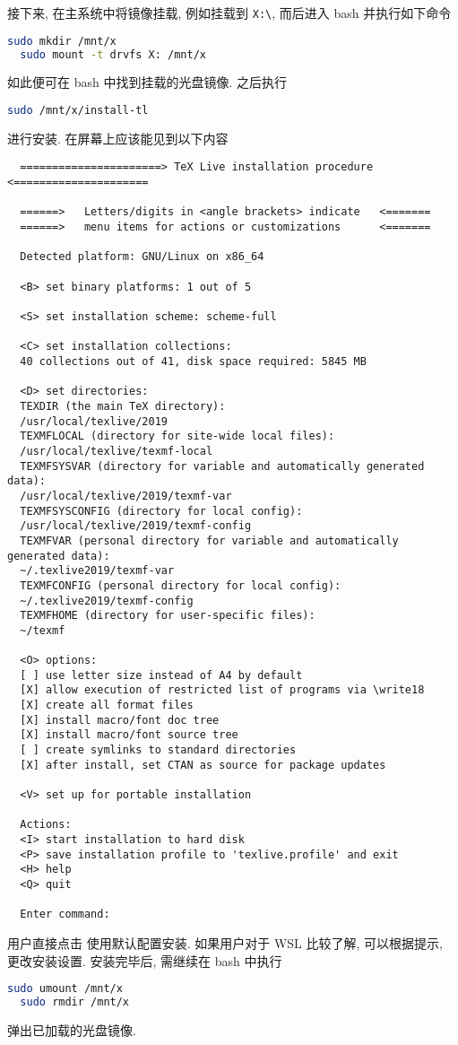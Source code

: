 接下来, 在主系统中将镜像挂载,
例如挂载到 \texttt{X:\textbackslash},
而后进入 \textsf{bash} 并执行如下命令
\begin{lstlisting}[language = bash]
  sudo mkdir /mnt/x
  sudo mount -t drvfs X: /mnt/x
\end{lstlisting}
如此便可在 \textsf{bash} 中找到挂载的光盘镜像.
之后执行
\begin{lstlisting}[language = bash]
  sudo /mnt/x/install-tl
\end{lstlisting}
进行安装.
在屏幕上应该能见到以下内容
\begin{lstlisting}
  ======================> TeX Live installation procedure <=====================

  ======>   Letters/digits in <angle brackets> indicate   <=======
  ======>   menu items for actions or customizations      <=======
  
  Detected platform: GNU/Linux on x86_64
  
  <B> set binary platforms: 1 out of 5
  
  <S> set installation scheme: scheme-full
  
  <C> set installation collections:
  40 collections out of 41, disk space required: 5845 MB
  
  <D> set directories:
  TEXDIR (the main TeX directory):
  /usr/local/texlive/2019
  TEXMFLOCAL (directory for site-wide local files):
  /usr/local/texlive/texmf-local
  TEXMFSYSVAR (directory for variable and automatically generated data):
  /usr/local/texlive/2019/texmf-var
  TEXMFSYSCONFIG (directory for local config):
  /usr/local/texlive/2019/texmf-config
  TEXMFVAR (personal directory for variable and automatically generated data):
  ~/.texlive2019/texmf-var
  TEXMFCONFIG (personal directory for local config):
  ~/.texlive2019/texmf-config
  TEXMFHOME (directory for user-specific files):
  ~/texmf

  <O> options:
  [ ] use letter size instead of A4 by default
  [X] allow execution of restricted list of programs via \write18
  [X] create all format files
  [X] install macro/font doc tree
  [X] install macro/font source tree
  [ ] create symlinks to standard directories
  [X] after install, set CTAN as source for package updates
  
  <V> set up for portable installation
  
  Actions:
  <I> start installation to hard disk
  <P> save installation profile to 'texlive.profile' and exit
  <H> help
  <Q> quit
  
  Enter command: 
\end{lstlisting}
用户直接点击  使用默认配置安装.
如果用户对于 WSL 比较了解, 可以根据提示, 更改安装设置.
安装完毕后, 需继续在 \textsf{bash} 中执行
\begin{lstlisting}[language = bash]
  sudo umount /mnt/x
  sudo rmdir /mnt/x
\end{lstlisting}
弹出已加载的光盘镜像.

